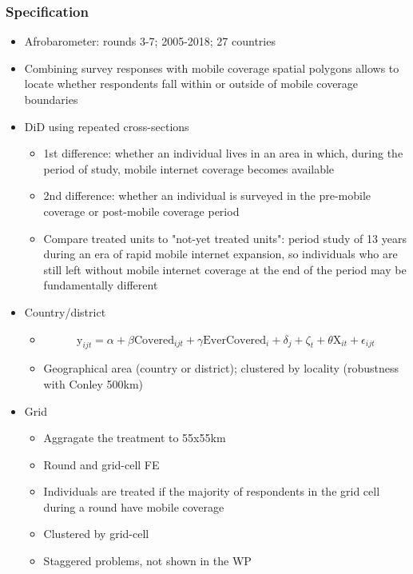 \documentclass[11pt]{article}
\begin{document}
\subsubsection*{Specification}
\begin{itemize}
    \item Afrobarometer: rounds 3-7; 2005-2018; 27 countries
    \item Combining survey responses with mobile coverage spatial polygons allows to locate whether respondents fall within or outside of mobile coverage boundaries
    \item DiD using repeated cross-sections
    \begin{itemize}
    \item 1st difference: whether an individual lives in an area in which, during the period of study, mobile internet coverage becomes available
    \item 2nd difference: whether an individual is surveyed in the pre-mobile coverage or post-mobile coverage period
    \item Compare treated units to "not-yet treated units": period study of 13 years during an era of rapid mobile internet expansion, so individuals who are still left without mobile internet coverage at the end of the period may be fundamentally different
    \end{itemize}

    \item Country/district 
    \begin{itemize}
     \item        \begin{equation*}
        \text{y}_{ijt} = \alpha + \beta \text{Covered}_{ijt} + \gamma \text{EverCovered}_{i} + \delta_j + \zeta_t + \theta \text{X}_{it} + \epsilon_{ijt}
        \end{equation*}
    \item Geographical area (country or district); clustered by locality (robustness with Conley 500km)
\end{itemize}

    \item Grid
    \begin{itemize}
        \item Aggragate the treatment to 55x55km
        \item Round and grid-cell FE
        \item Individuals are treated if the majority of respondents in the grid cell during a round have mobile coverage
        \item Clustered by grid-cell
        \item Staggered problems, not shown in the WP
    \end{itemize}         

\end{itemize}
\end{document}
